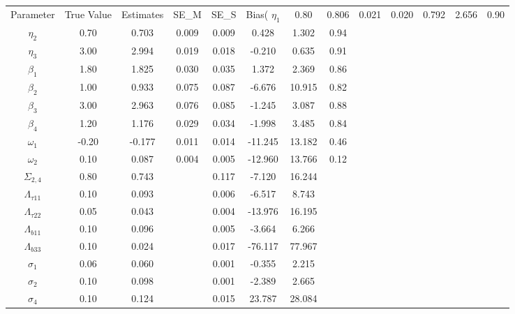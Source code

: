 \begin{table}[ht]
\centering
\begin{tabular}{cccccccc}
  \hline
Parameter & True Value & Estimates & SE_M & SE_S & Bias(%
  \hline
\hline
$\eta_1$ & 0.80 & 0.806 & 0.021 & 0.020 & 0.792 & 2.656 & 0.90 \\ 
  $\eta_2$ & 0.70 & 0.703 & 0.009 & 0.009 & 0.428 & 1.302 & 0.94 \\ 
  $\eta_3$ & 3.00 & 2.994 & 0.019 & 0.018 & -0.210 & 0.635 & 0.91 \\ 
  $\beta_1$ & 1.80 & 1.825 & 0.030 & 0.035 & 1.372 & 2.369 & 0.86 \\ 
  $\beta_2$ & 1.00 & 0.933 & 0.075 & 0.087 & -6.676 & 10.915 & 0.82 \\ 
  $\beta_3$ & 3.00 & 2.963 & 0.076 & 0.085 & -1.245 & 3.087 & 0.88 \\ 
  $\beta_4$ & 1.20 & 1.176 & 0.029 & 0.034 & -1.998 & 3.485 & 0.84 \\ 
  $\omega_1$ & -0.20 & -0.177 & 0.011 & 0.014 & -11.245 & 13.182 & 0.46 \\ 
  $\omega_2$ & 0.10 & 0.087 & 0.004 & 0.005 & -12.960 & 13.766 & 0.12 \\ 
   \hline
$\Sigma_{2,4}$ & 0.80 & 0.743 &  & 0.117 & -7.120 & 16.244 &  \\ 
  $\Lambda_{\tau11}$ & 0.10 & 0.093 &  & 0.006 & -6.517 & 8.743 &  \\ 
  $\Lambda_{\tau22}$ & 0.05 & 0.043 &  & 0.004 & -13.976 & 16.195 &  \\ 
  $\Lambda_{b11}$ & 0.10 & 0.096 &  & 0.005 & -3.664 & 6.266 &  \\ 
  $\Lambda_{b33}$ & 0.10 & 0.024 &  & 0.017 & -76.117 & 77.967 &  \\ 
  $\sigma_1$ & 0.06 & 0.060 &  & 0.001 & -0.355 & 2.215 &  \\ 
  $\sigma_2$ & 0.10 & 0.098 &  & 0.001 & -2.389 & 2.665 &  \\ 
  $\sigma_4$ & 0.10 & 0.124 &  & 0.015 & 23.787 & 28.084 &  \\ 
  \end{tabular}
\end{table}
